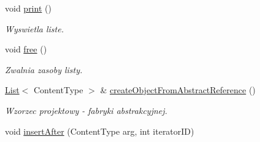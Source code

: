 \begin{DoxyCompactItemize}
void \hyperlink{class_table_list_ac86216a7fa45df30895310d507e84870}{print} ()
\begin{DoxyCompactList}\small\item\em Wyswietla liste. \end{DoxyCompactList}\item 
void \hyperlink{class_table_list_ad9e40fae405779ab4e64b6b0b3b7043d}{free} ()
\begin{DoxyCompactList}\small\item\em Zwalnia zasoby listy. \end{DoxyCompactList}\item 
\hyperlink{class_list}{List}$<$ Content\-Type $>$ \& \hyperlink{class_table_list_aa1b1cd5af5d33c0248fd9080da7fc4be}{create\-Object\-From\-Abstract\-Reference} ()
\begin{DoxyCompactList}\small\item\em Wzorzec projektowy -\/ fabryki abstrakcyjnej. \end{DoxyCompactList}\item 
void \hyperlink{class_table_list_a3eb9c154160816f561aa96501c4c9c31}{insert\-After} (Content\-Type arg, int iterator\-I\-D)
\end{DoxyCompactItemize}
